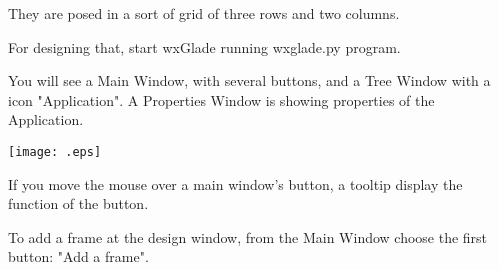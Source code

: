 \documentclass[a4paper,10pt]{book}
\begin{document}
                                                    
                                                    
                                                    
                                                    They are posed in a sort of grid of three rows and two columns.
                                                    
                                                    
                                                    
                                                    
                                                    
                                                    For designing that, start wxGlade running wxglade.py program.
                                                    
                                                    
                                                    
                                                    
                                                    You will see a Main Window, with several buttons, and a Tree
                                                     Window with a icon "Application".  A Properties Window is showing
                                                     properties of the Application.
                                                    
                                                    
                                                    \texttt{[image: .eps]}

                                                    
                                                    
                                                    If you move the mouse over a main window's button, a tooltip
                                                     display the function of the button.
                                                    
                                                    
                                                    
                                                    
                                                    To add a frame at the design window, from the Main Window choose
                                                     the first button: "Add a frame". 
                                                    
\end{document}
